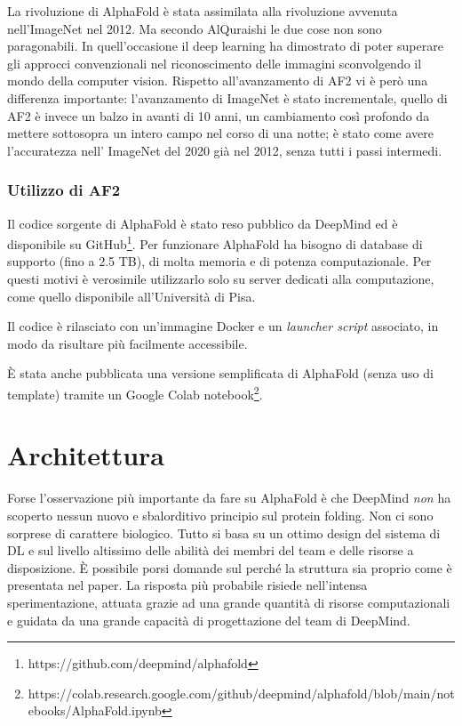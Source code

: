 \par La rivoluzione di AlphaFold è stata assimilata alla rivoluzione avvenuta nell'ImageNet nel 2012. Ma secondo AlQuraishi le due cose non sono paragonabili. In quell'occasione il deep learning ha dimostrato di poter superare gli approcci convenzionali nel riconoscimento delle immagini sconvolgendo il mondo della computer vision. Rispetto all'avanzamento di AF2 vi è però una differenza importante: l'avanzamento di ImageNet è stato incrementale, quello di AF2 è invece un balzo in avanti di 10 anni, un cambiamento così profondo da mettere sottosopra un intero campo nel corso di una notte; è stato come avere l'accuratezza nell' ImageNet del 2020 già nel 2012, senza tutti i passi intermedi.

\subsubsection{Utilizzo di AF2}

Il codice sorgente di AlphaFold è stato reso pubblico da DeepMind ed è disponibile su GitHub\footnote{https://github.com/deepmind/alphafold}. Per funzionare AlphaFold ha bisogno di database di supporto (fino a 2.5 TB), di molta memoria e di potenza computazionale. Per questi motivi è verosimile utilizzarlo solo su server dedicati alla computazione, come quello disponibile all'Università di Pisa.

\par Il codice è rilasciato con un'immagine Docker e un \textit{launcher script} associato, in modo da risultare più facilmente accessibile. 

\par È stata anche pubblicata una versione semplificata di AlphaFold (senza uso di template) tramite un Google Colab notebook\footnote{https://colab.research.google.com/github/deepmind/alphafold/blob/main/notebooks/AlphaFold.ipynb}.


\section{Architettura}

Forse l'osservazione più importante da fare su AlphaFold è che DeepMind \textit{non} ha scoperto nessun nuovo e sbalorditivo principio sul protein folding. Non ci sono sorprese di carattere biologico. Tutto si basa su un ottimo design del sistema di DL e sul livello altissimo delle abilità dei membri del team e delle risorse a disposizione. È possibile porsi domande sul perché la struttura sia proprio come è presentata nel paper. La risposta più probabile risiede nell'intensa sperimentazione, attuata grazie ad una grande quantità di risorse computazionali e guidata da una grande capacità di progettazione del team di DeepMind.

